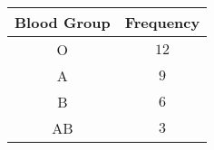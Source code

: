 \begin{tabular}{|c|c|}

\hline
\textbf{Blood Group} & \textbf{Frequency} \\
\hline
O & $12$ \\
\hline
A & $9$ \\
\hline
B & $6$ \\
\hline
AB & $3$  \\
\hline
\end{tabular}